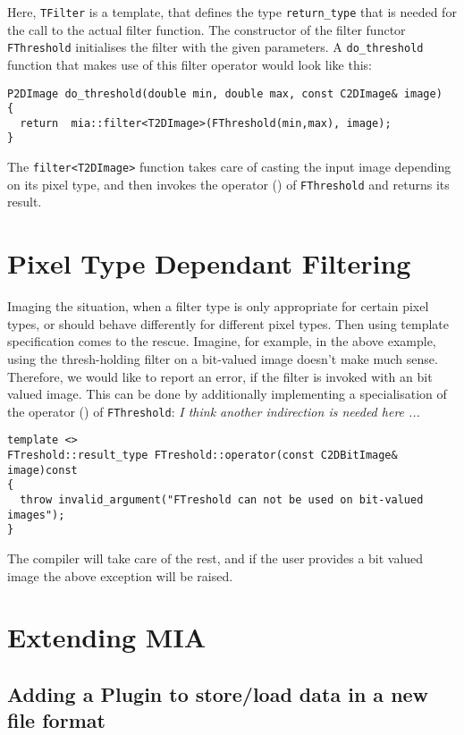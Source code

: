 \documentclass[english, 10pt, a4paper,headsepline,openany]{scrbook}
\begin{document}
Here, \texttt{TFilter} is a template, that defines the type \texttt{return\_type} that is needed for the call to the actual filter function. 
The constructor of the filter functor \texttt{FThreshold} initialises the filter with the given parameters. 
A \texttt{do\_threshold} function that makes use of this filter operator would look like this:   
  
\begin{lstlisting}
P2DImage do_threshold(double min, double max, const C2DImage& image)
{  
  return  mia::filter<T2DImage>(FThreshold(min,max), image);
}   
\end{lstlisting}

The \texttt{filter<T2DImage>} function takes care of casting the input image depending on its pixel type, and then invokes 
  the operator () of \texttt{FThreshold} and returns its result.
  
\section{Pixel Type Dependant Filtering}
\label{sec:ptdf}

Imaging the situation, when a filter type is only appropriate for certain pixel types, or should behave differently for different
   pixel types. 
Then using template specification comes to the rescue. 
Imagine, for example, in the above example, using the thresh-holding filter on a bit-valued image doesn't make much sense. 
Therefore, we would like to report an error, if the filter is invoked with an bit valued image. 
This can be done  by additionally implementing a specialisation of the operator () of \texttt{FThreshold}: 
\emph{I think another indirection is needed here ...}
\begin{lstlisting}
template <>
FTreshold::result_type FTreshold::operator(const C2DBitImage& image)const 
{
  throw invalid_argument("FTreshold can not be used on bit-valued images"); 
}
\end{lstlisting}
 
The compiler will take care of the rest, and if the user provides a bit valued image the above exception will be raised. 


\section{Extending MIA}
\label{ch:io}

\subsection{Adding a Plugin to store/load data in a new file format}
\label{sec:newfilehandler}
\end{document}
